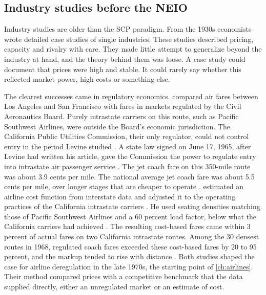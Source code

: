 \subsection{Industry studies before the NEIO}\label{sec:01-early-studies}

Industry studies are older than the SCP paradigm. From the 1930s economists wrote detailed case studies of single
industries. These studies described pricing, capacity and rivalry with care. They made little attempt to generalize beyond the industry at hand, and the theory behind them was
loose. A case study could document that prices were high and stable. It could rarely say whether this reflected
market power, high costs or something else.

The clearest successes came in regulatory economics. \citet{Levine1965} compared air fares between Los Angeles
and San Francisco with fares in markets regulated by the Civil Aeronautics Board. Purely intrastate carriers on
this route, such as Pacific Southwest Airlines, were outside the Board's economic jurisdiction. The California
Public Utilities Commission, their only regulator, could not control entry in the period Levine studied
\citep[pp.~1430--1431]{Levine1965}. A state law signed on June 17, 1965, after Levine had written his article, gave the
Commission the power to regulate entry into intrastate air passenger service \citep[p.~1431, n.~63]{Levine1965}. The jet coach fare on this 350-mile route was about 3.9 cents per mile. The
national average jet coach fare was about 5.5 cents per mile, over longer stages that are cheaper to operate
\citep[p.~1433]{Levine1965}.
\citet{Keeler1972} estimated an airline cost function from interstate data and adjusted it to the operating
practices of the California intrastate carriers \citep[pp.~400--401]{Keeler1972}. He used seating densities
matching those of Pacific Southwest Airlines and a 60 percent load factor, below what the California carriers had
achieved \citep[pp.~405--406, 415 and 417]{Keeler1972}. The resulting
cost-based fares came within 3 percent of actual fares on two California intrastate routes. Among the 30 densest
routes in 1968, regulated coach fares exceeded these cost-based fares by 20 to 95 percent, and the markup tended
to rise with distance \citep[p.~416 and Table~6]{Keeler1972}. Both studies shaped the case for airline deregulation in the
late 1970s, the starting point of \cref{ch:airlines}. Their method compared prices with a competitive benchmark that
the data supplied directly, either an unregulated market or an estimate of cost.


